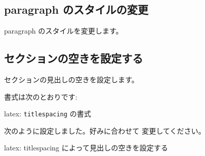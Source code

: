 \documentclass[dvipdfmx,a4j,14pt,uplatex,openany]{jsbook}
\begin{document}
\subsection{paragraph のスタイルの変更}
\label{sec:orgb735a89}
paragraph のスタイルを変更します。




\subsection{セクションの空きを設定する}
\label{sec:orgff933b7}
セクションの見出しの空きを設定します。

書式は次のとおりです:

\begin{programlist}[label={org2c6da87}]{latex}{: \texttt{titlespacing} の書式}
\end{programlist}

次のように設定しました。好みに合わせて
変更してください。

\begin{programlist}[label={org929ec22}]{latex}{: titlespacing によって見出しの空きを設定する}\titlespacing*{\section}{0em}{2em}{2em}
\titlespacing*{\subsection}{0em}{2em}{2em}
\titlespacing*{\subsubsection}{0em}{2em}{2em}
\titlespacing*{\paragraph}{0em}{2em}{2em}
\end{programlist}
\end{document}
